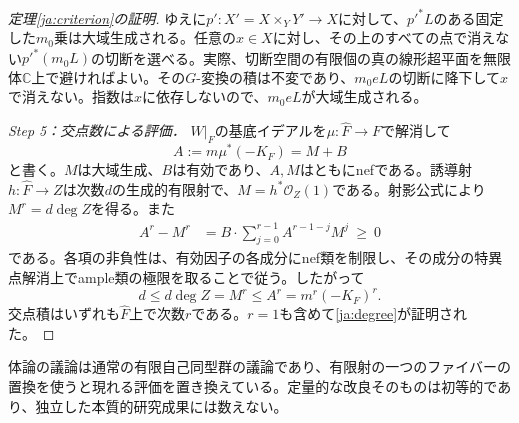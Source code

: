 \documentclass[12pt]{amsart}
\theoremstyle{definition}
\theoremstyle{remark}
\numberwithin{equation}{section}
\newcommand{\cO}{\mathcal{O}}
\newcommand{\C}{\mathbb{C}}
\begin{document}
\begin{proof}[定理\ref{ja:criterion}の証明]
ゆえに$p':X'=X\times_Y Y'\to X$に対して、$p'^*L$のある固定した$m_0$乗は大域生成される。任意の$x\in X$に対し、その上のすべての点で消えない$p'^*(m_0L)$の切断を選べる。実際、切断空間の有限個の真の線形超平面を無限体$\C$上で避ければよい。その$G$-変換の積は不変であり、$m_0eL$の切断に降下して$x$で消えない。指数は$x$に依存しないので、$m_0eL$が大域生成される。

\textit{Step 5：交点数による評価．}
$W|_F$の基底イデアルを$\mu:\widehat F\to F$で解消して
\[
 A:=m\mu^*(-K_F)=M+B
\]
と書く。$M$は大域生成、$B$は有効であり、$A,M$はともにnefである。誘導射$h:\widehat F\to Z$は次数$d$の生成的有限射で、$M=h^*\cO_Z(1)$である。射影公式により$M^r=d\deg Z$を得る。また
\begin{align*}
 A^r-M^r
 &=B\cdot\sum_{j=0}^{r-1}A^{r-1-j}M^j\ \geq\ 0
\end{align*}
である。各項の非負性は、有効因子の各成分にnef類を制限し、その成分の特異点解消上でample類の極限を取ることで従う。したがって
\[
 d\leq d\deg Z=M^r\leq A^r=m^r(-K_F)^r.
\]
交点積はいずれも$\widehat F$上で次数$r$である。$r=1$も含めて\eqref{ja:degree}が証明された。
\end{proof}

体論の議論は通常の有限自己同型群の議論であり、有限射の一つのファイバーの置換を使うと現れる評価を置き換えている。定量的な改良そのものは初等的であり、独立した本質的研究成果には数えない。
\end{document}
